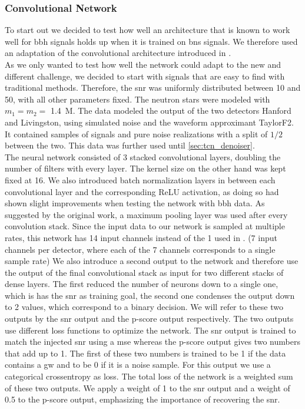 \subsubsection{Convolutional Network}\label{sec:evolution_convolution}
To start out we decided to test how well an architecture that is known to work well for \gls{bbh} signals holds up when it is trained on \gls{bns} signals. We therefore used an adaptation of the convolutional architecture introduced in \cite{huerta_parameter_estimation}.\\
As we only wanted to test how well the network could adapt to the new and different challenge, we decided to start with signals that are easy to find with traditional methods. Therefore, the \gls{snr} was uniformly distributed between 10 and 50, with all other parameters fixed. The neutron stars were modeled with $m_1=m_2=$ \SI{1.4}{M_\odot}. The data modeled the output of the two detectors Hanford and Livingston, using simulated noise and the waveform approximant TaylorF2. It contained samples of signals and pure noise realizations with a split of $1/2$ between the two. This data was further used until \autoref{sec:tcn_denoiser}.\\
The neural network consisted of 3 stacked convolutional layers, doubling the number of filters with every layer. The kernel size on the other hand was kept fixed at 16. We also introduced batch normalization layers in between each convolutional layer and the corresponding ReLU activation, as doing so had shown slight improvements when testing the network with \gls{bbh} data. As suggested by the original work, a maximum pooling layer was used after every convolution stack. Since the input data to our network is sampled at multiple rates, this network has 14 input channels instead of the 1 used in \cite{huerta_parameter_estimation}. (7 input channels per detector, where each of the 7 channels corresponds to a single sample rate) We also introduce a second output to the network and therefore use the output of the final convolutional stack as input for two different stacks of dense layers. The first reduced the number of neurons down to a single one, which is has the \gls{snr} as training goal, the second one condenses the output down to 2 values, which correspond to a binary decision. We will refer to these two outputs by the \gls{snr} output and the p-score output respectively. The two outputs use different loss functions to optimize the network. The \gls{snr} output is trained to match the injected \gls{snr} using a \gls{mse} whereas the p-score output gives two numbers that add up to 1. The first of these two numbers is trained to be 1 if the data contains a \gls{gw} and to be 0 if it is a noise sample. For this output we use a categorical crossentropy as loss. The total loss of the network is a weighted sum of these two outputs. We apply a weight of 1 to the \gls{snr} output and a weight of 0.5 to the p-score output, emphasizing the importance of recovering the \gls{snr}.\\
